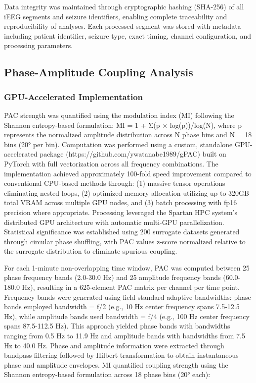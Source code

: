	Data integrity was maintained through cryptographic hashing (SHA-256) of all iEEG segments and seizure identifiers, enabling complete traceability and reproducibility of analyses. Each processed segment was stored with metadata including patient identifier, seizure type, exact timing, channel configuration, and processing parameters.

\subsection{Phase-Amplitude Coupling Analysis}
\subsubsection{GPU-Accelerated Implementation}
PAC strength was quantified using the modulation index (MI) \cite{Tort} following the Shannon entropy-based formulation: MI = 1 + Σ(p × log(p))/log(N), where p represents the normalized amplitude distribution across N phase bins and N = 18 bins (20° per bin). Computation was performed using a custom, standalone GPU-accelerated package (https://github.com/ywatanabe1989/gPAC) built on PyTorch with full vectorization across all frequency combinations. The implementation achieved approximately 100-fold speed improvement compared to conventional CPU-based methods through: (1) massive tensor operations eliminating nested loops, (2) optimized memory allocation utilizing up to 320GB total VRAM across multiple GPU nodes, and (3) batch processing with fp16 precision where appropriate. Processing leveraged the Spartan HPC system's distributed GPU architecture  with automatic multi-GPU parallelization. Statistical significance was established using 200 surrogate datasets generated through circular phase shuffling, with PAC values z-score normalized relative to the surrogate distribution to eliminate spurious coupling.

	For each 1-minute non-overlapping time window, PAC was computed between 25 phase frequency bands (2.0-30.0 Hz) and 25 amplitude frequency bands (60.0-180.0 Hz), resulting in a 625-element PAC matrix per channel per time point. Frequency bands were generated using field-standard adaptive bandwidths: phase bands employed bandwidth = f/2 (e.g., 10 Hz center frequency spans 7.5-12.5 Hz), while amplitude bands used bandwidth = f/4 (e.g., 100 Hz center frequency spans 87.5-112.5 Hz). This approach yielded phase bands with bandwidths ranging from 0.5 Hz to 11.9 Hz and amplitude bands with bandwidths from 7.5 Hz to 40.0 Hz. Phase and amplitude information were extracted through bandpass filtering followed by Hilbert transformation to obtain instantaneous phase and amplitude envelopes. MI quantified coupling strength using the Shannon entropy-based formulation across 18 phase bins (20° each):

